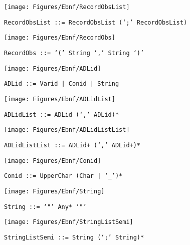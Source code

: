  \begin{figure}[H]
  \centering
  \texttt{[image: Figures/Ebnf/RecordObsList]}
  \caption*{\texttt{RecordObsList \small::=  RecordObsList (`;' RecordObsList)}}
  \label{fig:ebnf-RecordObsList}
 \end{figure}

 \begin{figure}[H]
  \centering
  \texttt{[image: Figures/Ebnf/RecordObs]}
  \caption*{\texttt{RecordObs \small::=  `(' String `,' String `)'}}
  \label{fig:ebnf-RecordObs}
 \end{figure}

 \begin{figure}[H]
  \centering
  \texttt{[image: Figures/Ebnf/ADLid]}
  \caption*{\texttt{ADLid \small::=  Varid | Conid | String}}
  \label{fig:ebnf-ADLid}
 \end{figure}

 \begin{figure}[H]
  \centering
  \texttt{[image: Figures/Ebnf/ADLidList]}
  \caption*{\texttt{ADLidList \small::=  ADLid (`,' ADLid)*}}
  \label{fig:ebnf-ADLidList}
 \end{figure}

 \begin{figure}[H]
  \centering
  \texttt{[image: Figures/Ebnf/ADLidListList]}
  \caption*{\texttt{ADLidListList \small::=  ADLid+ (`,' ADLid+)*}}
  \label{fig:ebnf-ADLidListList}
 \end{figure}

 \begin{figure}[H]
  \centering
  \texttt{[image: Figures/Ebnf/Conid]}
  \caption*{\texttt{Conid \small::=  UpperChar (Char | `\_')*}}
  \label{fig:ebnf-Conid}
 \end{figure}

 \begin{figure}[H]
  \centering
  \texttt{[image: Figures/Ebnf/String]}
  \caption*{\texttt{String \small::=  `"' Any* `"'}}
  \label{fig:ebnf-String}
 \end{figure}

 \begin{figure}[H]
  \centering
  \texttt{[image: Figures/Ebnf/StringListSemi]}
  \caption*{\texttt{StringListSemi \small::=  String (`;' String)*}}
  \label{fig:ebnf-StringListSemi}
 \end{figure}

